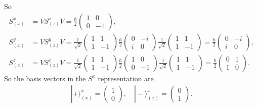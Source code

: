 \documentclass[../../main.tex]{subfiles}
\begin{document}
\begin{enumerate}
{{  So
  \begin{align*}
    S^{x}_{(x)} &= VS^{x}_{(z)}V = \frac{\hbar}{2}\begin{pmatrix}
      1&0\\
      0&-1
    \end{pmatrix},\\ 
    S^{y}_{(x)} &= VS^{y}_{(z)}V = \frac{1}{\sqrt{2}}\begin{pmatrix}
      1 & 1 \\
      1 & -1
    \end{pmatrix}\frac{\hbar}{2}\begin{pmatrix}
      0 & -i \\
      i & 0
    \end{pmatrix}\frac{1}{\sqrt{2}}\begin{pmatrix}
      1 & 1 \\
      1 & -1
    \end{pmatrix} = \frac{\hbar}{2}\begin{pmatrix}
      0 & -i \\
      i & 0
    \end{pmatrix},\\
    S^{z}_{(x)} &= VS^{z}_{(z)}V = \frac{1}{\sqrt{2}}\begin{pmatrix}
      1 & 1 \\
      1 & -1
    \end{pmatrix}\frac{\hbar}{2}\begin{pmatrix}
      1 & 0 \\
      0 & -1
    \end{pmatrix}\frac{1}{\sqrt{2}}\begin{pmatrix}
      1 & 1 \\
      1 & -1
    \end{pmatrix} = \frac{\hbar}{2}\begin{pmatrix}
      0 & 1\\
      1 & 0
    \end{pmatrix}.
  \end{align*}
  So the basis vectors in the $S^{x}$ representation are 
  \begin{align*}
    |+\rangle_{(x)}^{x} = \begin{pmatrix}
      1\\
      0
    \end{pmatrix},\quad |-\rangle_{(x)}^{x} = \begin{pmatrix}
      0\\
      1
    \end{pmatrix}.
  \end{align*}}}
\end{enumerate}
\end{document}
